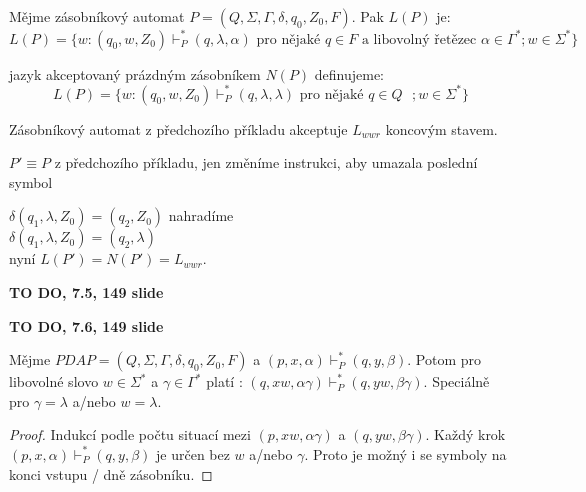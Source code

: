 \documentclass[../main.tex]{subfiles}
\begin{document}
    \begin{definition}
        Mějme zásobníkový automat $P = (Q,\Sigma, \Gamma, \delta, q_0, Z_0, F)$. Pak $L(P)$ je:
        \[L(P) = \{w : (q_0, w, Z_0) \vdash^*_P (q, \lambda, \alpha) \text{ pro nějaké $q\in F$ a libovolný řetězec } \alpha \in \Gamma^*; w \in \Sigma^*\}\]

        jazyk akceptovaný prázdným zásobníkem $N(P)$ definujeme:
        \[L(P) = \{w : (q_0, w, Z_0) \vdash^*_P (q, \lambda, \lambda) \text{ pro nějaké $q\in Q$ }; w \in \Sigma^*\}\]
    \end{definition}

    \begin{example}
        Zásobníkový automat z předchozího příkladu akceptuje $L_{wwr}$ koncovým stavem.
    \end{example}

    \begin{example}
        $P' \equiv P$ z předchozího příkladu, jen změníme instrukci, aby umazala poslední symbol

        $\delta(q_1, \lambda, Z_0) = {(q_2,Z_0)}$ nahradíme\\
        $\delta(q_1, \lambda, Z_0) = {(q_2,\lambda)}$\\
        nyní $L(P') = N(P') = L_{wwr}$.        
    \end{example}

    \begin{example}
        \textbf{TO DO, 7.5, 149 slide}
    \end{example}

    \begin{example}
        \textbf{TO DO, 7.6, 149 slide}
    \end{example}

    \begin{theorem}
        Mějme $PDA P = (Q,\Sigma, \Gamma, \delta, q_0, Z_0, F)$ a $(p,x,\alpha)\vdash^*_P (q,y,\beta)$.
        Potom pro libovolné slovo $w \in \Sigma^*$ a $\gamma \in \Gamma^*$ platí : $(q,xw,\alpha \gamma)\vdash^*_P (q,yw, \beta \gamma)$.
        Speciálně pro $\gamma = \lambda$ a/nebo $w = \lambda$.
    \end{theorem}
    \begin{proof}
        Indukcí podle počtu situací mezi $(p, xw, \alpha \gamma)$ a $(q, yw, \beta \gamma)$. Každý krok
        $(p,x,\alpha) \vdash^*_P (q,y,\beta)$ je určen bez $w$ a/nebo $\gamma$. Proto je možný i se symboly na konci vstupu / dně zásobníku.
    \end{proof}
\end{document}
